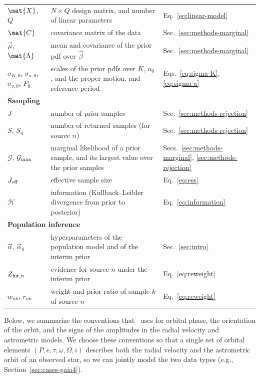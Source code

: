 \documentclass[twocolumn]{AASTeX7/aastex701}
\newcommand{\harv}{\package{harv}}
\begin{document}
\begin{table}
\begin{tabular}{l>{\raggedright\arraybackslash}p{}l}
    $\mat{X}$, $Q$ & $N \times Q$ design matrix, and number of linear parameters
      & Eq.~\ref{eq:linear-model} \\
    $\mat{C}$ & covariance matrix of the data & Sec.~\ref{sec:methods-marginal} \\
    $\vec{\mu}$, $\mat{\Lambda}$ & mean and covariance of the prior pdf over $\vec{\beta}$
      & Sec.~\ref{sec:methods-marginal} \\
    $\sigma_{K,0}$, $\sigma_{a,0}$, $\sigma_{v,0}$, $P_0$ & scales of the prior pdfs over
      $K$, $a_0$, and the proper motion, and reference period
      & Eqs.~\ref{eq:sigma-K}, \ref{eq:sigma-a} \\
    \hline
    \multicolumn{3}{l}{\textbf{Sampling}} \\
    $J$ & number of prior samples & Sec.~\ref{sec:methods-rejection} \\
    $S$, $S_n$ & number of returned samples (for source $n$) & Sec.~\ref{sec:methods-rejection} \\
    $\mathcal{G}$, $\mathcal{G}_{\rm max}$ & marginal likelihood of a prior sample, and its
      largest value over the prior samples
      & Secs.~\ref{sec:methods-marginal}, \ref{sec:methods-rejection} \\
    $J_{\rm eff}$ & effective sample size & Eq.~\ref{eq:ess} \\
    $\mathcal{H}$ & information (Kullback--Leibler divergence from prior to posterior)
      & Eq.~\ref{eq:information} \\
    \hline
    \multicolumn{3}{l}{\textbf{Population inference}} \\
    $\vec{\alpha}$, $\vec{\alpha}_0$ & hyperparameters of the population model and of the
      interim prior & Sec.~\ref{sec:intro} \\
    $Z_{{\rm int},n}$ & evidence for source $n$ under the interim prior
      & Eq.~\ref{eq:reweight} \\
    $w_{nk}$, $r_{nk}$ & weight and prior ratio of sample $k$ of source $n$
      & Eq.~\ref{eq:reweight} \\
    \hline
  \end{tabular}
\end{table}

Below, we summarize the conventions that \harv\ uses for orbital phase, the orientation
of the orbit, and the signs of the amplitudes in the radial velocity and astrometric
models.
We choose these conventions so that a single set of orbital elements $(P, e, \tau,
\omega, \Omega, i)$ describes both the radial velocity and the astrometric orbit of an
observed star, so we can jointly model the two data types (e.g.,
Section~\ref{sec:cases-gaia4}).
\end{document}

